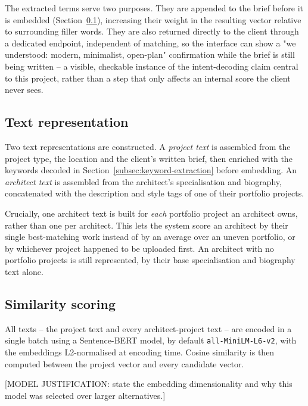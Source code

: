 The extracted terms serve two purposes. They are appended to the brief
before it is embedded (Section~\ref{subsec:text-representation}),
increasing their weight in the resulting vector relative to surrounding
filler words. They are also returned directly to the client through a
dedicated endpoint, independent of matching, so the interface can show a
"we understood: modern, minimalist, open-plan" confirmation while the
brief is still being written -- a visible, checkable instance of the
intent-decoding claim central to this project, rather than a step that
only affects an internal score the client never sees.

\subsection{Text representation}
\label{subsec:text-representation}

Two text representations are constructed. A \emph{project text} is
assembled from the project type, the location and the client's written
brief, then enriched with the keywords decoded in
Section~\ref{subsec:keyword-extraction} before embedding. An
\emph{architect text} is assembled from the architect's specialisation
and biography, concatenated with the description and style tags of one
of their portfolio projects.

Crucially, one architect text is built for \emph{each} portfolio project
an architect owns, rather than one per architect. This lets the system
score an architect by their single best-matching work instead of by an
average over an uneven portfolio, or by whichever project happened to be
uploaded first. An architect with no portfolio projects is still
represented, by their base specialisation and biography text alone.

\subsection{Similarity scoring}
\label{subsec:similarity-scoring}

All texts -- the project text and every architect-project text -- are
encoded in a single batch using a Sentence-BERT model, by default
\texttt{all-MiniLM-L6-v2}, with the embeddings L2-normalised at encoding
time. Cosine similarity is then computed between the project vector and
every candidate vector.

[MODEL JUSTIFICATION: state the embedding dimensionality and why this
model was selected over larger alternatives.]

